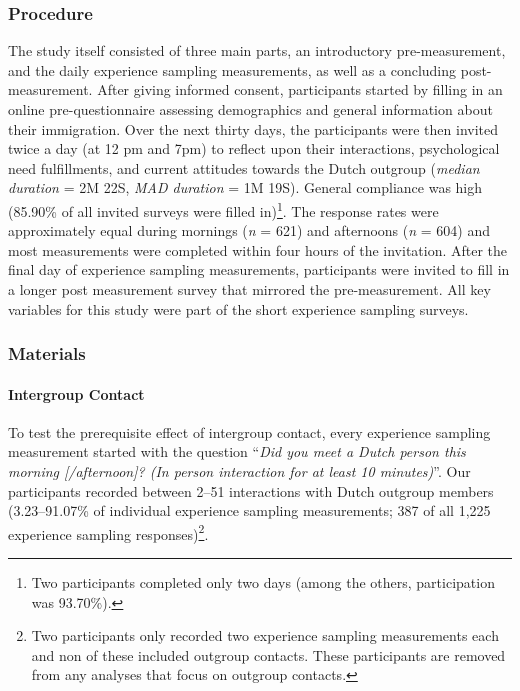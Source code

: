 \subsubsection{Procedure}

The study itself consisted of three main parts, an introductory
pre-measurement, and the daily experience sampling measurements, as well
as a concluding post-measurement. After giving informed consent,
participants started by filling in an online pre-questionnaire assessing
demographics and general information about their immigration. Over the
next thirty days, the participants were then invited twice a day (at 12
pm and 7pm) to reflect upon their interactions, psychological need
fulfillments, and current attitudes towards the Dutch outgroup
(\textit{median duration} = 2M 22S, \textit{MAD duration} = 1M 19S).
General compliance was high (85.90\% of all invited surveys were filled
in)\footnote{Two participants completed only two days (among the others, participation was 93.70\%).}.
The response rates were approximately equal during mornings (\textit{n}
= 621) and afternoons (\textit{n} = 604) and most measurements were
completed within four hours of the invitation. After the final day of
experience sampling measurements, participants were invited to fill in a
longer post measurement survey that mirrored the pre-measurement. All
key variables for this study were part of the short experience sampling
surveys.

\subsubsection{Materials}

\paragraph{Intergroup Contact}

To test the prerequisite effect of intergroup contact, every experience
sampling measurement started with the question
``\textit{Did you meet a Dutch person this morning [/afternoon]? (In person interaction for at least 10 minutes)}''.
Our participants recorded between 2--51 interactions with Dutch outgroup
members (3.23--91.07\% of individual experience sampling measurements;
387 of all 1,225 experience sampling
responses)\footnote{Two participants only recorded two experience sampling measurements each and non of these included outgroup contacts. These participants are removed from any analyses that focus on outgroup contacts.}.

